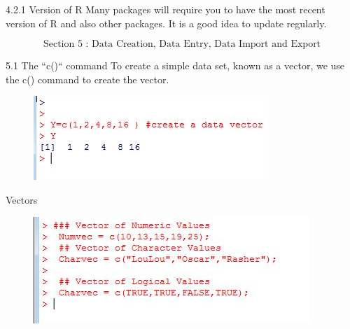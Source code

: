 \documentclass{beamer}
\begin{document}

{4.2.1 Version of R}
Many packages will require you to have the most recent version of R and also other packages.
It is a good idea to update regularly.


\[\mbox{Section 5 : Data Creation, Data Entry, Data Import and Export}\]


{5.1 The ``c()`` command}
To create a simple data set, known as a vector, we use the c() command to create the vector.
\begin{figure}
\centering
\includegraphics[width=1.2\linewidth]{images/makevector1}
\end{figure}




{Vectors}
\begin{figure}
\centering
\includegraphics[width=1.2\linewidth]{images/makevectors}
\end{figure}


\end{document}
